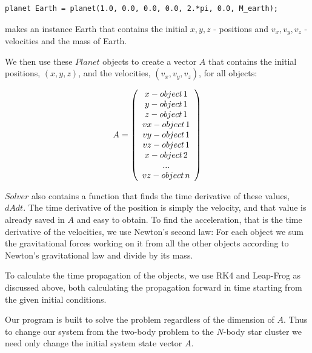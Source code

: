 \documentclass[a4paper,12pt, english]{article}
\begin{document}
\begin{lstlisting}[title={Making of instance}]
planet Earth = planet(1.0, 0.0, 0.0, 0.0, 2.*pi, 0.0, M_earth);
\end{lstlisting}

makes an instance Earth that contains the initial $x, y, z$ - positions and $v_x, v_y, v_z$ - velocities and the mass of Earth.

We then use these $Planet$ objects to create a vector $A$ that contains the initial positions, $(x,y,z)$, and the velocities, $(v_x,v_y,v_z)$, for all objects:

\[ A = \left( \begin{array}{c}
x - object \hspace*{0.5mm} 1\\
y - object \hspace*{0.5mm} 1\\
z - object \hspace*{0.5mm} 1 \\
vx - object \hspace*{0.5mm} 1\\
vy -object \hspace*{0.5mm} 1\\
vz - object \hspace*{0.5mm} 1 \\
x - object \hspace*{0.5mm} 2\\
... \\
vz - object \hspace*{0.5mm} n \end{array} \right)\]

$Solver$ also contains a function that finds the time derivative of these values, $dAdt$. The time derivative of the position is simply the velocity, and that value is already saved in $A$ and easy to obtain. To find the acceleration, that is the time derivative of the velocities, we use Newton's second law: For each object we sum the gravitational forces working on it from all the other objects according to Newton's gravitational law and divide by its mass.

To calculate the time propagation of the objects, we use RK4 and Leap-Frog as discussed above, both calculating the propagation forward in time starting from the given initial conditions.

Our program is built to solve the problem regardless of the dimension of $A$. Thus to change our system from the two-body problem to the $N$-body star cluster we need only change the initial system state vector $A$.
\end{document}
